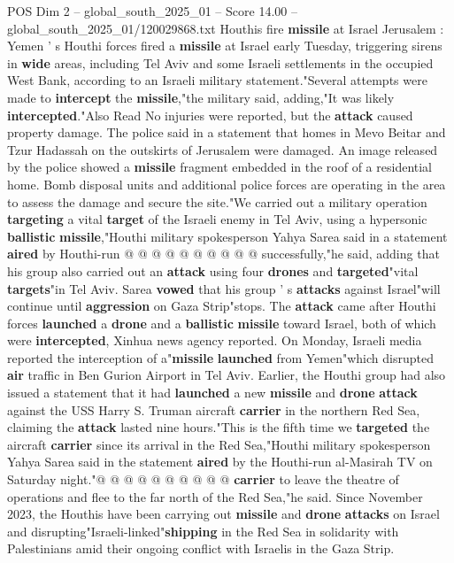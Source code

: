 \begin{textsample}{POS Dim 2 – global\_south\_2025\_01 – Score 14.00 – global\_south\_2025\_01/120029868.txt}  \label{ex:f2_pos_330}
Houthis fire \textbf{missile} at Israel Jerusalem : Yemen ' s Houthi forces fired a \textbf{missile} at Israel early Tuesday, triggering sirens in \textbf{wide} areas, including Tel Aviv and some Israeli settlements in the occupied West Bank, according to an Israeli military statement."Several attempts were made to \textbf{intercept} the \textbf{missile},"the military said, adding,"It was likely \textbf{intercepted}."Also Read No injuries were reported, but the \textbf{attack} caused property damage.
The police said in a statement that homes in Mevo Beitar and Tzur Hadassah on the outskirts of Jerusalem were damaged.
An image released by the police showed a \textbf{missile} fragment embedded in the roof of a residential home.
Bomb disposal units and additional police forces are operating in the area to assess the damage and secure the site."We carried out a military operation \textbf{targeting} a vital \textbf{target} of the Israeli enemy in Tel Aviv, using a hypersonic \textbf{ballistic} \textbf{missile},"Houthi military spokesperson Yahya Sarea said in a statement \textbf{aired} by Houthi-run @ @ @ @ @ @ @ @ @ @ successfully,"he said, adding that his group also carried out an \textbf{attack} using four \textbf{drones} and \textbf{targeted}"vital \textbf{targets}"in Tel Aviv.
Sarea \textbf{vowed} that his group ' s \textbf{attacks} against Israel"will continue until \textbf{aggression} on Gaza Strip"stops.
The \textbf{attack} came after Houthi forces \textbf{launched} a \textbf{drone} and a \textbf{ballistic} \textbf{missile} toward Israel, both of which were \textbf{intercepted}, Xinhua news agency reported.
On Monday, Israeli media reported the interception of a"\textbf{missile} \textbf{launched} from Yemen"which disrupted \textbf{air} traffic in Ben Gurion Airport in Tel Aviv.
Earlier, the Houthi group had also issued a statement that it had \textbf{launched} a new \textbf{missile} and \textbf{drone} \textbf{attack} against the USS Harry S.
Truman aircraft \textbf{carrier} in the northern Red Sea, claiming the \textbf{attack} lasted nine hours."This is the fifth time we \textbf{targeted} the aircraft \textbf{carrier} since its arrival in the Red Sea,"Houthi military spokesperson Yahya Sarea said in the statement \textbf{aired} by the Houthi-run al-Masirah TV on Saturday night."@ @ @ @ @ @ @ @ @ @ \textbf{carrier} to leave the theatre of operations and flee to the far north of the Red Sea,"he said.
Since November 2023, the Houthis have been carrying out \textbf{missile} and \textbf{drone} \textbf{attacks} on Israel and disrupting"Israeli-linked"\textbf{shipping} in the Red Sea in solidarity with Palestinians amid their ongoing conflict with Israelis in the Gaza Strip.

\end{textsample}
